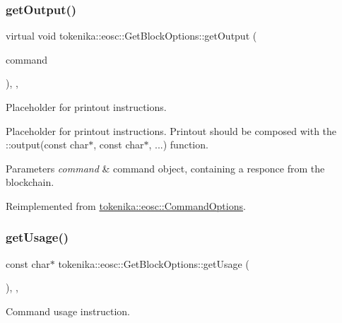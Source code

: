 \subsubsection{\texorpdfstring{get\+Output()}{getOutput()}}
{\footnotesize\ttfamily virtual void tokenika\+::eosc\+::\+Get\+Block\+Options\+::get\+Output (\begin{DoxyParamCaption}\item[{\hyperlink{classtokenika_1_1eosc_1_1_eosc_command}{Eosc\+Command}}]{command }\end{DoxyParamCaption})\hspace{0.3cm}{\ttfamily [inline]}, {\ttfamily [protected]}, {\ttfamily [virtual]}}



Placeholder for printout instructions. 

Placeholder for printout instructions. Printout should be composed with the \+::output(const char$\ast$, const char$\ast$, ...) function.


\begin{DoxyParams}{Parameters}
{\em command} & command object, containing a responce from the blockchain. \\
\hline
\end{DoxyParams}


Reimplemented from \hyperlink{classtokenika_1_1eosc_1_1_command_options_a346dcfb00b8ac522169714544bfa7be0}{tokenika\+::eosc\+::\+Command\+Options}.

\mbox{\label{classtokenika_1_1eosc_1_1_get_block_options_ab0b7572223d35a3232630b9eef51b9cb}} 
\subsubsection{\texorpdfstring{get\+Usage()}{getUsage()}}
{\footnotesize\ttfamily const char$\ast$ tokenika\+::eosc\+::\+Get\+Block\+Options\+::get\+Usage (\begin{DoxyParamCaption}{ }\end{DoxyParamCaption})\hspace{0.3cm}{\ttfamily [inline]}, {\ttfamily [protected]}, {\ttfamily [virtual]}}



Command \textquotesingle{}usage\textquotesingle{} instruction. 

